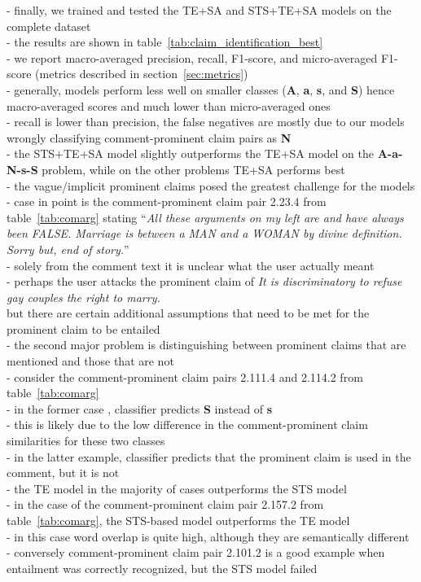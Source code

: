 - finally, we trained and tested the TE+SA and STS+TE+SA models on the complete 
\ComArg dataset \\
- the results are shown in table~\ref{tab:claim_identification_best} \\
- we report macro-averaged precision, recall, F1-score, and 
micro-averaged F1-score (metrics described in section~\ref{sec:metrics}) \\
- generally, models perform less well on smaller classes (\textbf{A},
\textbf{a}, \textbf{s}, and \textbf{S}) hence macro-averaged scores and much lower than
micro-averaged ones \\
- recall is lower than precision, the false negatives are mostly due to our models
wrongly classifying comment-prominent claim pairs as \textbf{N} \\
- the STS+TE+SA model slightly outperforms the TE+SA model on the \textbf{A-a-N-s-S} problem,
while on the other problems TE+SA performs best \\

- the vague/implicit prominent claims posed the greatest challenge for the models \\
- case in point is the comment-prominent claim pair 2.23.4 from table~\ref{tab:comarg}  stating 
``\textit{All these arguments on my left are and have always been FALSE. Marriage is
between a MAN and a WOMAN by divine definition. Sorry but, end of story.}''
\\
- solely from the comment text it is unclear what the user actually meant \\
- perhaps the user attacks the prominent claim of 
\textit{ It is discriminatory to refuse gay couples the right to marry.} \\
but there are certain additional assumptions that need to be met for the prominent claim 
to be entailed \\
- the second major problem is distinguishing between prominent claims that are mentioned 
and those that are not \\
- consider the comment-prominent claim pairs 2.111.4 and 2.114.2 from table~\ref{tab:comarg} \\
- in the former case , classifier predicts \textbf{S} instead of \textbf{s} \\
- this is likely due to the low difference in the comment-prominent claim similarities for these
two classes \\
- in the latter example, classifier predicts that the prominent claim is used in the comment, but
it is not \\
- the TE model in the majority of cases outperforms the STS model \\
- in the case of the comment-prominent claim pair 2.157.2 from table~\ref{tab:comarg}, the STS-based
model outperforms the TE model \\
- in this case word overlap is quite high, although they are semantically different \\
- conversely comment-prominent claim pair 2.101.2 is a good example when entailment was correctly recognized, 
but the STS model failed \\

